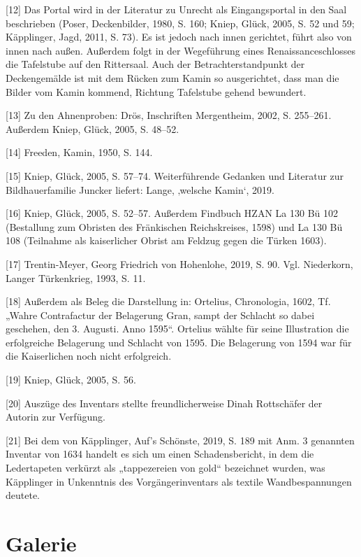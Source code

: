 \documentclass[
  a4paper,
  openany]{book}
\begin{document}
{[}12{]} Das Portal wird in der Literatur zu Unrecht als Eingangsportal
in den Saal beschrieben (Poser, Deckenbilder, 1980, S. 160; Kniep,
Glück, 2005, S. 52 und 59; Käpplinger, Jagd, 2011, S. 73). Es ist jedoch
nach innen gerichtet, führt also von innen nach außen. Außerdem folgt in
der Wegeführung eines Renaissanceschlosses die Tafelstube auf den
Rittersaal. Auch der Betrachterstandpunkt der Deckengemälde ist mit dem
Rücken zum Kamin so ausgerichtet, dass man die Bilder vom Kamin kommend,
Richtung Tafelstube gehend bewundert.

{[}13{]} Zu den Ahnenproben: Drös, Inschriften Mergentheim, 2002, S.
255--261. Außerdem Kniep, Glück, 2005, S. 48--52.

{[}14{]} Freeden, Kamin, 1950, S. 144.

{[}15{]} Kniep, Glück, 2005, S. 57--74. Weiterführende Gedanken und
Literatur zur Bildhauerfamilie Juncker liefert: Lange, ‚welsche Kamin`,
2019.

{[}16{]} Kniep, Glück, 2005, S. 52--57. Außerdem Findbuch HZAN La 130 Bü
102 (Bestallung zum Obristen des Fränkischen Reichskreises, 1598) und La
130 Bü 108 (Teilnahme als kaiserlicher Obrist am Feldzug gegen die
Türken 1603).

{[}17{]} Trentin-Meyer, Georg Friedrich von Hohenlohe, 2019, S. 90. Vgl.
Niederkorn, Langer Türkenkrieg, 1993, S. 11.

{[}18{]} Außerdem als Beleg die Darstellung in: Ortelius, Chronologia,
1602, Tf. „Wahre Contrafactur der Belagerung Gran, sampt der Schlacht so
dabei geschehen, den 3. Augusti. Anno 1595``. Ortelius wählte für seine
Illustration die erfolgreiche Belagerung und Schlacht von 1595. Die
Belagerung von 1594 war für die Kaiserlichen noch nicht erfolgreich.

{[}19{]} Kniep, Glück, 2005, S. 56.

{[}20{]} Auszüge des Inventars stellte freundlicherweise Dinah
Rottschäfer der Autorin zur Verfügung.

{[}21{]} Bei dem von Käpplinger, Auf's Schönste, 2019, S. 189 mit Anm. 3
genannten Inventar von 1634 handelt es sich um einen Schadensbericht, in
dem die Ledertapeten verkürzt als „tappezereien von gold`` bezeichnet
wurden, was Käpplinger in Unkenntnis des Vorgängerinventars als textile
Wandbespannungen deutete.


\chapter{Galerie}\label{galerie}
\end{document}
